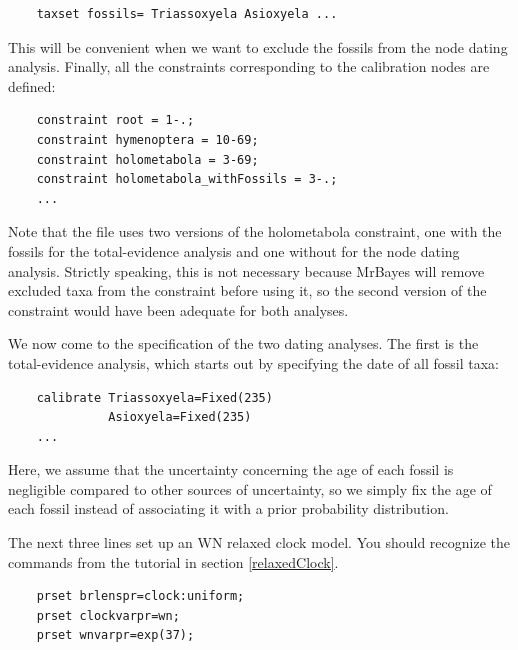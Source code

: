 \documentclass[12pt]{book}
\begin{document}
\small
\begin{verbatim}
    taxset fossils= Triassoxyela Asioxyela ...
\end{verbatim}
\normalsize

This will be convenient when we want to exclude the fossils from the node dating analysis. Finally,
all the constraints corresponding to the calibration nodes are defined:

\small
\begin{singlespacing}
\begin{verbatim}
    constraint root = 1-.;
    constraint hymenoptera = 10-69;
    constraint holometabola = 3-69;
    constraint holometabola_withFossils = 3-.;
    ...
\end{verbatim}
\end{singlespacing}
\normalsize

Note that the file uses two versions of the holometabola constraint, one with the fossils for the
total-evidence analysis and one without for the node dating analysis. Strictly speaking, this is
not necessary because MrBayes will remove excluded taxa from the constraint before using it, so the
second version of the constraint would have been adequate for both analyses.

We now come to the specification of the two dating analyses. The first is the total-evidence
analysis, which starts out by specifying the date of all fossil taxa:

\small
\begin{singlespacing}
\begin{verbatim}
    calibrate Triassoxyela=Fixed(235)
              Asioxyela=Fixed(235)
    ...
\end{verbatim}
\end{singlespacing}
\normalsize

Here, we assume that the uncertainty concerning the age of each fossil is negligible compared to
other sources of uncertainty, so we simply fix the age of each fossil instead of associating it
with a prior probability distribution.

The next three lines set up an WN relaxed clock model. You should recognize the commands from the
tutorial in section \ref{relaxedClock}.

\small
\begin{singlespacing}
\begin{verbatim}
    prset brlenspr=clock:uniform;
    prset clockvarpr=wn;
    prset wnvarpr=exp(37);
\end{verbatim}
\end{singlespacing}
\normalsize
\end{document}
